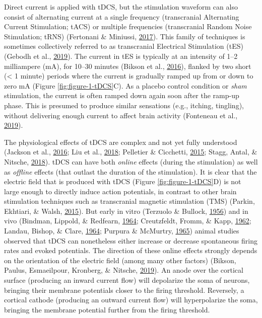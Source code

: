 \documentclass[11pt,]{memoir}
\begin{document}
Direct current is applied with tDCS, but the stimulation waveform can also consist of alternating current at a single frequency (transcranial Alternating Current Stimulation; tACS) or multiple frequencies (transcranial Random Noise Stimulation; tRNS) (Fertonani \& Miniussi, \protect\hyperlink{ref-Fertonani2017}{2017}). This family of techniques is sometimes collectively referred to as transcranial Electrical Stimulation (tES) (Gebodh et al., \protect\hyperlink{ref-Gebodh2019a}{2019}). The current in tES is typically at an intensity of 1--2 milliampere (mA), for 10--30 minutes (Bikson et al., \protect\hyperlink{ref-Bikson2016}{2016}), flanked by two short (\textless{} 1 minute) periods where the current is gradually ramped up from or down to zero mA (Figure \ref{fig:figure-1-tDCS}C). As a placebo control condition or \emph{sham} stimulation, the current is often ramped down again soon after the ramp-up phase. This is presumed to produce similar sensations (e.g., itching, tingling), without delivering enough current to affect brain activity (Fonteneau et al., \protect\hyperlink{ref-Fonteneau2019}{2019}).

The physiological effects of tDCS are complex and not yet fully understood (Jackson et al., \protect\hyperlink{ref-Jackson2016}{2016}; Liu et al., \protect\hyperlink{ref-Liu2018}{2018}; Pelletier \& Cicchetti, \protect\hyperlink{ref-Pelletier2015}{2015}; Stagg, Antal, \& Nitsche, \protect\hyperlink{ref-Stagg2018}{2018}). tDCS can have both \emph{online} effects (during the stimulation) as well as \emph{offline} effects (that outlast the duration of the stimulation). It is clear that the electric field that is produced with tDCS (Figure \ref{fig:figure-1-tDCS}D) is not large enough to directly induce action potentials, in contrast to other brain stimulation techniques such as transcranial magnetic stimulation (TMS) (Parkin, Ekhtiari, \& Walsh, \protect\hyperlink{ref-Parkin2015}{2015}). But early in vitro (Terzuolo \& Bullock, \protect\hyperlink{ref-Terzuolo1956}{1956}) and in vivo (Bindman, Lippold, \& Redfearn, \protect\hyperlink{ref-Bindman1964}{1964}; Creutzfeldt, Fromm, \& Kapp, \protect\hyperlink{ref-Creutzfeldt1962}{1962}; Landau, Bishop, \& Clare, \protect\hyperlink{ref-Landau1964}{1964}; Purpura \& McMurtry, \protect\hyperlink{ref-Purpura1965}{1965}) animal studies observed that tDCS can nonetheless either increase or decrease spontaneous firing rates and evoked potentials. The direction of these online effects strongly depends on the orientation of the electric field (among many other factors) (Bikson, Paulus, Esmaeilpour, Kronberg, \& Nitsche, \protect\hyperlink{ref-Bikson2019}{2019}). An anode over the cortical surface (producing an inward current flow) will depolarize the soma of neurons, bringing their membrane potentials closer to the firing threshold. Reversely, a cortical cathode (producing an outward current flow) will hyperpolarize the soma, bringing the membrane potential further from the firing threshold.
\end{document}
